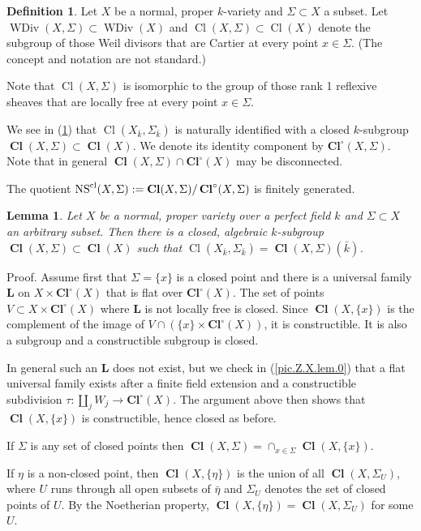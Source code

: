 \documentclass{amsart}
\newtheorem{lem}[thm]{Lemma}
\theoremstyle{definition}
\newtheorem{defn}[thm]{Definition}
\theoremstyle{remark}
\newcommand{\ns}[0]{\operatorname{NS}}
\newcommand{\cl}[0]{\operatorname{Cl}}
\newcommand{\clos}[0]{\operatorname{\mathbf{Cl}^{\circ}}}
\newcommand{\cls}[0]{\operatorname{\mathbf{Cl}}}
\newcommand{\wdiv}[0]{\operatorname{WDiv}}
\begin{document}
\begin{defn} \label{pic.Z.X.def}
Let $X$ be a normal, proper $k$-variety and $\Sigma\subset X$ a  subset. Let
$\wdiv(X, \Sigma)\subset \wdiv(X)$  and
 $\cl(X, \Sigma)\subset \cl(X)$ denote the subgroup of those Weil divisors that are Cartier at every point $x\in \Sigma$. (The concept and notation are not standard.)


Note that  $\cl(X, \Sigma)$ is isomorphic to  the group of those rank 1 reflexive sheaves that are locally free  at every point $x\in \Sigma$.

We see in (\ref{pic.Z.X.lem}) that 
$\cl(X_{\bar k}, \Sigma_{\bar k})$ is naturally identified with  a closed $k$-subgroup $\cls(X, \Sigma)\subset \cls(X)$.
We denote its identity  component by  $\clos(X, \Sigma)$.  
Note that in general  $\cls(X, \Sigma)\cap \clos(X)$ may be disconnected.

The quotient
$\ns^{\rm cl}(X, \Sigma):=\cls(X, \Sigma)/\clos(X, \Sigma)$  is finitely generated.
\end{defn}


\begin{lem} \label{pic.Z.X.lem}
Let $X$ be a  normal, proper variety over a perfect field $k$ and $\Sigma\subset X$ an arbitrary  subset. Then there is a closed, algebraic  $k$-subgroup
$\cls(X, \Sigma)\subset \cls(X)$ such that $\cl(X_{\bar k}, \Sigma_{\bar k})=\cls(X, \Sigma)(\bar k)$.
\end{lem}

Proof.  Assume first that  $\Sigma=\{x\}$   is a closed point  and
there is a universal family  ${\mathbf L}$ on $X\times \clos(X)$ that is flat  over  $\clos(X)$. The set of points  $V\subset X\times \clos(X)$ where ${\mathbf L}$ is not locally free is closed. Since 
$\cls(X, \{x\})$ is the complement of the image of
$V\cap (\{x\}\times \clos(X))$, it is constructible.  It is also a subgroup and a constructible subgroup is closed. 

In general such an ${\mathbf L}$ does not exist, but we check in (\ref{pic.Z.X.lem.0}) that a flat universal family exists after a finite field extension and a constructible subdivision  $\tau:\amalg_j W_j\to \clos(X)$.
The argument above then shows that $\cls(X, \{x\})$ is constructible, hence closed as before.

If $\Sigma$   is any set of closed  points then $\cls(X, \Sigma)=\cap_{x\in \Sigma} \cls(X, \{x\})$. 


If $\eta$   is a non-closed  point,  then
$\cls(X, \{\eta\})$ is the union of all
$\cls(X, \Sigma_U)$, where $U$ runs through all open subsets of $\bar\eta$ and
$\Sigma_U$ denotes the set of closed points of $U$. By the Noetherian property,
$\cls(X, \{\eta\})=\cls(X, \Sigma_U)$ for some $U$. 
\end{document}
